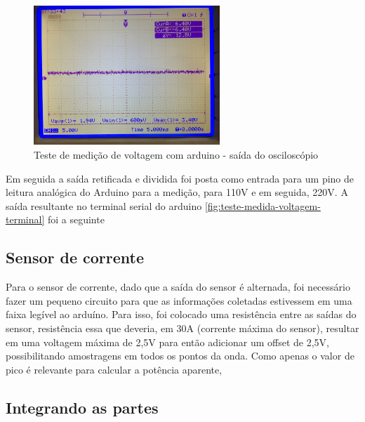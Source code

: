 \begin{figure}[H]
\centering
\includegraphics[width=7cm,keepaspectratio]{figuras/teste-medicao-voltagem-osc.jpg} 
\caption{\label{fig:teste-medicao-voltagem-osc} Teste de medição de voltagem com arduino - saída do osciloscópio}
\end{figure}

Em seguida a saída retificada e dividida foi posta como entrada para um pino de leitura analógica do Arduino para a medição, para 110V e em seguida, 220V. A saída resultante no terminal serial do arduino \ref{fig:teste-medida-voltagem-terminal} foi a seguinte


\subsection{Sensor de corrente}

Para o sensor de corrente, dado que a saída do sensor é alternada, foi necessário fazer um pequeno circuito para que as informações coletadas estivessem em uma faixa legível ao arduíno. Para isso, foi colocado uma resistência entre as saídas do sensor, resistência essa que deveria, em 30A (corrente máxima do sensor), resultar em uma voltagem máxima de 2,5V para então adicionar um offset de 2,5V, possibilitando amostragens em todos os pontos da onda. Como apenas o valor de pico é relevante para calcular a potência aparente, 


\subsection{Integrando as partes}

